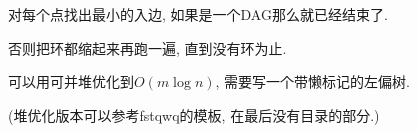 对每个点找出最小的入边, 如果是一个DAG那么就已经结束了.

否则把环都缩起来再跑一遍, 直到没有环为止.

可以用可并堆优化到$O(m\log n)$, 需要写一个带懒标记的左偏树.

(堆优化版本可以参考fstqwq的模板, 在最后没有目录的部分.)